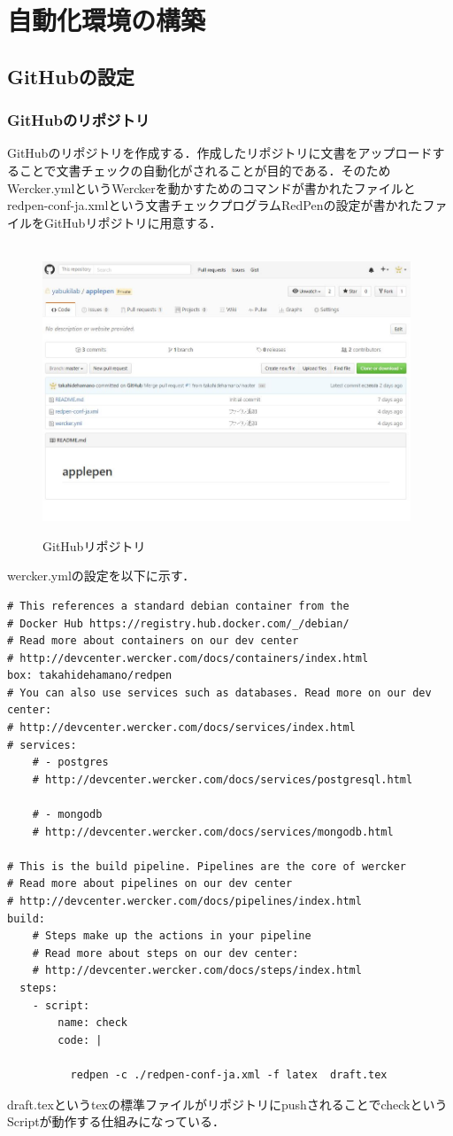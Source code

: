 \chapter{自動化環境の構築}
\section{GitHubの設定}
\subsection{GitHubのリポジトリ}
GitHubのリポジトリを作成する．作成したリポジトリに文書をアップロードすることで文書チェックの自動化がされることが目的である．そのためWercker.ymlというWerckerを動かすためのコマンドが書かれたファイルとredpen-conf-ja.xmlという文書チェックプログラムRedPenの設定が書かれたファイルをGitHubリポジトリに用意する．
\begin{figure}[htb]
\centering　
\includegraphics[width=11cm]{14.JPG}
\caption{GitHubリポジトリ}\label{tab:uac}
\end{figure}

\newpage
wercker.ymlの設定を以下に示す．
\begin{lstlisting}[basicstyle=\ttfamily\footnotesize, frame=single]
# This references a standard debian container from the
# Docker Hub https://registry.hub.docker.com/_/debian/
# Read more about containers on our dev center
# http://devcenter.wercker.com/docs/containers/index.html
box: takahidehamano/redpen
# You can also use services such as databases. Read more on our dev center:
# http://devcenter.wercker.com/docs/services/index.html
# services:
    # - postgres
    # http://devcenter.wercker.com/docs/services/postgresql.html

    # - mongodb
    # http://devcenter.wercker.com/docs/services/mongodb.html

# This is the build pipeline. Pipelines are the core of wercker
# Read more about pipelines on our dev center
# http://devcenter.wercker.com/docs/pipelines/index.html
build:
    # Steps make up the actions in your pipeline
    # Read more about steps on our dev center:
    # http://devcenter.wercker.com/docs/steps/index.html
  steps:
    - script:
        name: check
        code: |
        
          redpen -c ./redpen-conf-ja.xml -f latex  draft.tex

\end{lstlisting}
draft.texというtexの標準ファイルがリポジトリにpushされることでcheckというScriptが動作する仕組みになっている．
\newpage

